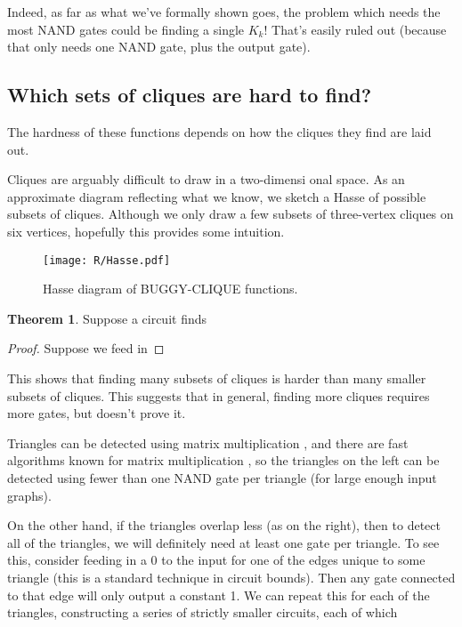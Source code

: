 \documentclass[12pt]{article}
\theoremstyle{definition}
\newtheorem{thm}{Theorem}[section]
\begin{document}
Indeed, as far as what we've formally shown goes, the problem which needs
the most NAND gates could be finding a single $K_k$! That's easily ruled out
(because that only needs one NAND gate, plus the output gate).

\subsection{Which sets of cliques are hard to find?}
\label{sec:whichCliques}

The hardness of these functions depends
on how the cliques they find are laid out.

Cliques are arguably difficult to draw in a two-dimensi onal space.
As an approximate diagram reflecting what we know,
we sketch a Hasse of possible subsets of cliques. Although
we only draw a few subsets of three-vertex cliques
on six vertices, hopefully this provides some
intuition.

\begin{figure}
\centering
\texttt{[image: R/Hasse.pdf]}
\caption{Hasse diagram of BUGGY-CLIQUE functions.}
\label{fig:Hasse}
\end{figure}


\begin{thm}
\label{edgeZonking}
Suppose a circuit finds 
\end{thm}
\begin{proof}
Suppose we feed in
\end{proof}

This shows that finding many subsets of cliques is harder than
many smaller subsets of cliques. This suggests that in general,
finding more cliques requires more gates, but doesn't prove it.


Triangles can be detected using matrix multiplication \cite{itai_finding_1977},
and there are fast algorithms known for matrix multiplication
\cite{strassen_gaussian_1969}
\cite{williams_multiplying_2012}, so
the triangles on the left can be detected
using fewer than one NAND gate per triangle (for large enough input graphs).

On the other hand, if the triangles overlap less (as on the right),
then to detect all of the triangles, we will definitely need at least one
gate per triangle.
To see this, consider feeding in a 0 to the input for one
of the edges unique to some triangle (this is a
standard technique in circuit bounds).
Then any gate connected to
that edge will only output a constant 1. We can repeat this for each of the
triangles, constructing a series of strictly smaller circuits, each of which 
\end{document}
